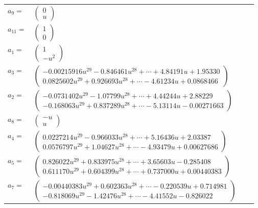 \documentclass[1p]{elsarticle_modified}
\theoremstyle{definition}
\begin{document}
\begin{tabular}{m{7pt} m{180pt} m{7pt} m{180pt} }
\flushright $a_{9}=$&$\begin{pmatrix}0\\u\end{pmatrix}$ \\
\flushright $a_{11}=$&$\begin{pmatrix}1\\0\end{pmatrix}$ \\
\flushright $a_{1}=$&$\begin{pmatrix}1\\- u^2\end{pmatrix}$ \\
\flushright $a_{3}=$&$\begin{pmatrix}-0.00215916 u^{29}-0.846461 u^{28}+\cdots+4.84191 u+1.95330\\0.0825602 u^{29}+0.926693 u^{28}+\cdots-4.61234 u+0.0868466\end{pmatrix}$ \\
\flushright $a_{2}=$&$\begin{pmatrix}-0.0731402 u^{29}-1.07799 u^{28}+\cdots+4.44244 u+2.88229\\-0.168063 u^{29}+0.837289 u^{28}+\cdots-5.13114 u-0.00271663\end{pmatrix}$ \\
\flushright $a_{8}=$&$\begin{pmatrix}- u\\u\end{pmatrix}$ \\
\flushright $a_{4}=$&$\begin{pmatrix}0.0227214 u^{29}-0.966033 u^{28}+\cdots+5.16436 u+2.03387\\0.0576797 u^{29}+1.04627 u^{28}+\cdots-4.93479 u+0.00627686\end{pmatrix}$ \\
\flushright $a_{5}=$&$\begin{pmatrix}0.826022 u^{29}+0.833975 u^{28}+\cdots+3.65603 u-0.285408\\0.611170 u^{29}+0.604399 u^{28}+\cdots+0.737000 u+0.00440383\end{pmatrix}$ \\
\flushright $a_{7}=$&$\begin{pmatrix}-0.00440383 u^{29}+0.602363 u^{28}+\cdots-0.220539 u+0.714981\\-0.818069 u^{29}-1.42476 u^{28}+\cdots-4.41552 u-0.826022\end{pmatrix}$ \\

\end{tabular}
\end{document}
